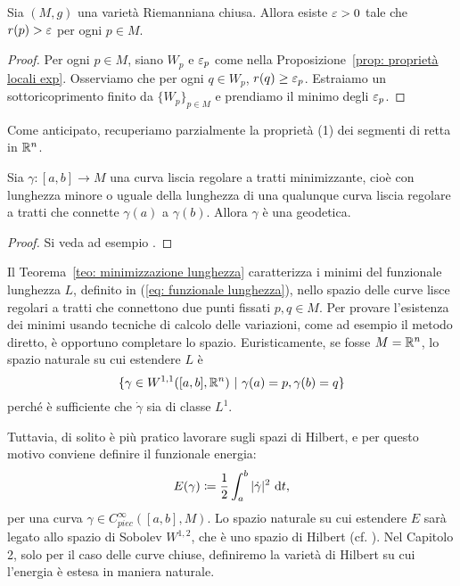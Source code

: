 	\begin{cor}\label{cor: epsilon per compatta}
		Sia \((M,g)\) una varietà Riemanniana chiusa. Allora esiste \(\varepsilon>0\) tale che \(r(p)>\varepsilon\) per ogni \(p \in M\). 
	\end{cor}
	\begin{proof}
		Per ogni \(p \in M\), siano \(W_p\) e \(\varepsilon_p\) come nella Proposizione~\ref{prop: proprietà locali exp}. Osserviamo che per ogni \(q \in W_p\), \(r(q)\geq \varepsilon_p\). Estraiamo un sottoricoprimento finito da \(\{W_p\}_{p \in M}\) e prendiamo il minimo degli \(\varepsilon_p\). 
	\end{proof}
	
	Come anticipato, recuperiamo parzialmente la proprietà (1) dei segmenti di retta in \(\mathbb{R}^n\).
	\begin{teo}\label{teo: minimizzazione lunghezza}
		Sia \(\gamma:[a,b] \to M\) una curva liscia regolare a tratti minimizzante, cioè con lunghezza minore o uguale della lunghezza di una qualunque curva liscia regolare a tratti che connette \(\gamma(a)\) a \(\gamma(b)\). Allora \(\gamma\) è una geodetica.
	\end{teo}
	\begin{proof}
		Si veda ad esempio \cite[Corollary 10.7]{milnor1963morse}.
	\end{proof}
	
	Il Teorema~\ref{teo: minimizzazione lunghezza} caratterizza i minimi del funzionale lunghezza \(L\), definito in (\ref{eq: funzionale lunghezza}), nello spazio delle curve lisce regolari a tratti che connettono due punti fissati \(p,q \in M\). Per provare l'esistenza dei minimi usando tecniche di calcolo delle variazioni, come ad esempio il metodo diretto, è opportuno completare lo spazio. Euristicamente, se fosse \(M = \mathbb{R}^n\), lo spazio naturale su cui estendere \(L\) è 
	\[	
	\{\gamma \in W^{1,1}([a,b],\R^n) \ | \ \gamma(a)=p, \gamma(b)=q\}
	\]
	perché è sufficiente che \(\dot \gamma\) sia di classe \(L^1\).
	
	Tuttavia, di solito è più pratico lavorare sugli spazi di Hilbert, e per questo motivo conviene definire il funzionale energia:
	\[
	E(\gamma) \coloneq \frac{1}{2} \int_a^b |\dot \gamma|^2 \ \mathrm{d} t,
	\]
	per una curva \(\gamma \in C^\infty_{piec}([a,b],M)\). Lo spazio naturale su cui estendere \(E\) sarà legato allo spazio di Sobolev \(W^{1,2}\), che è uno spazio di Hilbert (cf. \cite[Section~2.3]{klingenberg1995riemannian}). Nel Capitolo 2, solo per il caso delle curve chiuse, definiremo la varietà di Hilbert su cui l'energia è estesa in maniera naturale. 
	
